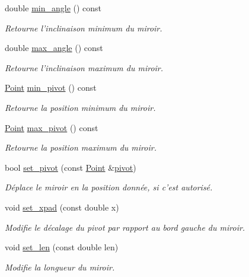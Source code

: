 \begin{DoxyCompactItemize}
double \hyperlink{classMirror_a84dc065cb7ca7b928b83df2169021673}{min\+\_\+angle} () const 
\begin{DoxyCompactList}\small\item\em Retourne l'inclinaison minimum du miroir. \end{DoxyCompactList}\item 
double \hyperlink{classMirror_ab06cd44bc9fa2fbd942c2e021439dc1c}{max\+\_\+angle} () const 
\begin{DoxyCompactList}\small\item\em Retourne l'inclinaison maximum du miroir. \end{DoxyCompactList}\item 
\hyperlink{classPoint}{Point} \hyperlink{classMirror_ac57f542afd7fe0fd02f5b028f22821d9}{min\+\_\+pivot} () const 
\begin{DoxyCompactList}\small\item\em Retourne la position minimum du miroir. \end{DoxyCompactList}\item 
\hyperlink{classPoint}{Point} \hyperlink{classMirror_a5c7aee32ae68bcc817b996859139e909}{max\+\_\+pivot} () const 
\begin{DoxyCompactList}\small\item\em Retourne la position maximum du miroir. \end{DoxyCompactList}\item 
bool \hyperlink{classMirror_a86285a234fb321578939d3f7597bfe6d}{set\+\_\+pivot} (const \hyperlink{classPoint}{Point} \&\hyperlink{classMirror_ad68e2946b5267e738663ffdf4b8841f5}{pivot})
\begin{DoxyCompactList}\small\item\em Déplace le miroir en la position donnée, si c'est autorisé. \end{DoxyCompactList}\item 
void \hyperlink{classMirror_a5abdb9ac393b5c4e78399567bd44fc1f}{set\+\_\+xpad} (const double x)
\begin{DoxyCompactList}\small\item\em Modifie le décalage du pivot par rapport au bord gauche du miroir. \end{DoxyCompactList}\item 
void \hyperlink{classMirror_a07555306d244772a41b160e905e14af4}{set\+\_\+len} (const double len)
\begin{DoxyCompactList}\small\item\em Modifie la longueur du miroir. \end{DoxyCompactList}\item 

\end{DoxyCompactItemize}
